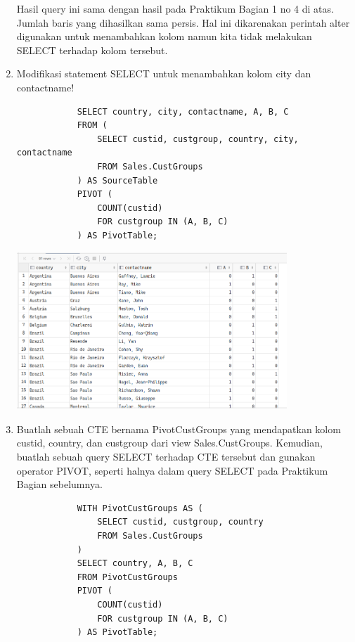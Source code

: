 \documentclass[12pt,titlepage]{article}
\begin{document}
\begin{enumerate}
{        Hasil query ini sama dengan hasil pada Praktikum Bagian 1 no 4 di atas. Jumlah baris yang
        dihasilkan sama persis. Hal ini dikarenakan perintah alter digunakan untuk menambahkan kolom
        namun kita tidak melakukan SELECT terhadap kolom tersebut.
    }
    \pagebreak
    \item {
        Modifikasi statement SELECT untuk menambahkan kolom city dan contactname!

        \begin{verbatim}
            SELECT country, city, contactname, A, B, C
            FROM (
                SELECT custid, custgroup, country, city, contactname
                FROM Sales.CustGroups
            ) AS SourceTable
            PIVOT (
                COUNT(custid)
                FOR custgroup IN (A, B, C)
            ) AS PivotTable;
        \end{verbatim}

        \begin{center}
            \includegraphics[width=0.8\textwidth]{./images/4.png}
        \end{center}
    }
    \pagebreak
    \item {
        Buatlah sebuah CTE bernama PivotCustGroups yang mendapatkan kolom custid,
        country, dan custgroup dari view Sales.CustGroups. Kemudian, buatlah sebuah query SELECT
        terhadap CTE tersebut dan gunakan operator PIVOT, seperti halnya dalam query SELECT pada
        Praktikum Bagian sebelumnya.

        \begin{verbatim}
            WITH PivotCustGroups AS (
                SELECT custid, custgroup, country
                FROM Sales.CustGroups
            )
            SELECT country, A, B, C
            FROM PivotCustGroups
            PIVOT (
                COUNT(custid)
                FOR custgroup IN (A, B, C)
            ) AS PivotTable;
        \end{verbatim}

}
\end{enumerate}
\end{document}
